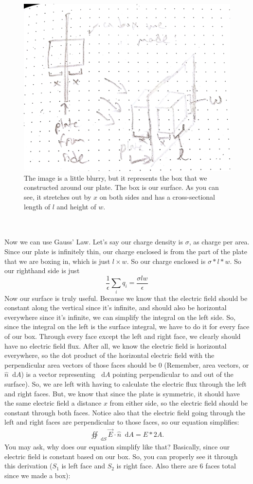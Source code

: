 \documentclass{article}
\newcommand*\dif{\mathop{}\!\mathrm{d}}
\begin{document}
\begin{figure}[ht]
\center
\includegraphics[width=.3\textwidth]{images/Week1pic4.jpg}
\caption{The image is a little blurry, but it represents the box that we constructed around our plate. The box is our surface. As you can see, it stretches out by $x$ on both sides and has a cross-sectional length of $l$ and height of $w$.}
\end{figure}\\
\\
Now we can use Gauss' Law. Let's say our charge density is $\sigma$, as charge per area. Since our plate is infinitely thin, our charge enclosed is from the part of the plate that we are boxing in, which is just $l\times w$. So our charge enclosed is $\sigma * l * w$. So our righthand side is just $$\frac{1}{\epsilon}\sum\limits_i q_i = \frac{\sigma lw}{\epsilon}$$Now our surface is truly useful. Because we know that the electric field should be constant along the vertical since it's infinite, and should also be horizontal everywhere since it's infinite, we can simplify the integral on the left side. So, since the integral on the left is the surface integral, we have to do it for every face of our box. Through every face except the left and right face, we clearly should have no electric field flux. After all, we know the electric field is horizontal everywhere, so the dot product of the horizontal electric field with the perpendicular area vectors of those faces should be $0$ (Remember, area vectors, or $\hat{n} \dif A$) is a vector representing $\dif A$ pointing perpendicular to and out of the surface). So, we are left with having to calculate the electric flux through the left and right faces. But, we know that since the plate is symmetric, it should have the same electric field a distance $x$ from either side, so the electric field should be constant through both faces. Notice also that the electric field going through the left and right faces are perpendicular to those faces, so our equation simplifies: 
\begin{align*}
	\oiint_{\dif S} \vec{E} \cdot \hat{n} \dif A = E*2A.
\end{align*}
You may ask, why does our equation simplify like that? Basically, since our electric field is constant based on our box. So, you can properly see it through this derivation ($S_1$ is left face and $S_2$ is right face. Also there are 6 faces total since we made a box):
\end{document}
